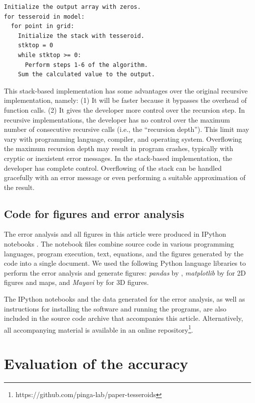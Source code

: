 \documentclass[manuscript,endfloat]{geophysics}
\begin{document}
\begin{verbatim}
Initialize the output array with zeros.
for tesseroid in model:
  for point in grid:
    Initialize the stack with tesseroid.
    stktop = 0
    while stktop >= 0:
      Perform steps 1-6 of the algorithm.
    Sum the calculated value to the output.
\end{verbatim}

This stack-based implementation
has some advantages over the original recursive implementation,
namely:
(1) It will be faster because it bypasses the overhead of function calls.
(2) It gives the developer more control over the recursion step.
In recursive implementations,
the developer has no control over
the maximum number of consecutive recursive calls
(i.e., the ``recursion depth'').
This limit may vary with programming language,
compiler, and operating system.
Overflowing the maximum recursion depth
may result in program crashes,
typically with cryptic or inexistent error messages.
In the stack-based implementation,
the developer has complete control.
Overflowing of the stack can be handled gracefully
with an error message
or even performing a suitable approximation of the result.

\subsection{Code for figures and error analysis}


The error analysis and all figures in this article
were produced in IPython notebooks
\citep{Perez2007}.
The notebook files combine source code in various programming languages,
program execution,
text, equations,
and the figures generated by the code
into a single document.
We used the following Python language libraries
to perform the error analysis and generate figures:
\emph{pandas} by \citet{Mckinney2010},
\emph{matplotlib} by \citet{Hunter2007} for 2D figures and maps,
and \emph{Mayavi} by \citet{Ramachandran2011} for 3D figures.

The IPython notebooks
and the data generated for the error analysis,
as well as instructions for installing the software
and running the programs,
are also included in
the source code archive that accompanies this article.
Alternatively,
all accompanying material is available
in an online repository\footnote{
https://github.com/pinga-lab/paper-tesseroids}.



\section{Evaluation of the accuracy}
\end{document}
